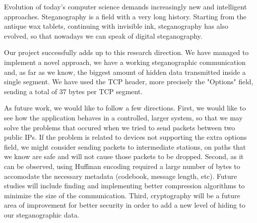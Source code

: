
Evolution of today's computer science demands increasingly new and intelligent
approaches. Steganography is a field with a very long history. Starting from
the antique wax tablets, continuing with invisible ink, steganography has also
evolved, so that nowadays we can speak of digital steganography.

Our project successfully adds up to this research direction. We have managed to
implement a novel approach, we have a working steganographic communication and,
as far as we know, the biggest amount of hidden data transmitted inside a
single segment. We have used the TCP header, more precisely the "Options"
field, sending a total of 37 bytes per TCP segment.

As future work, we would like to follow a few directions. First, we would like to
see how the application behaves in a controlled, larger system, so that we may solve
the problems that occured when we tried to send packets between two public IPs. If
the problem is related to devices not supporting the extra options field, we might 
consider sending packets to intermediate stations, on paths that we know are safe
and will not cause those packets to be dropped. Second, as it can be observed, using
Huffman encoding required a large number of bytes to accomodate the necessary metadata
(codebook, message length, etc). Future studies will include finding and
implementing better compression algorithms to minimize the size of the
communication. Third, cryptography will be a future area of improvement for
better security in order to add a new level of hiding to our steganographic data.
